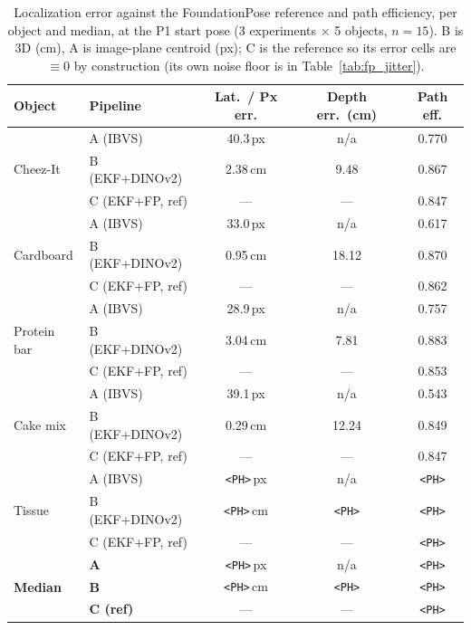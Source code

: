 \documentclass[letterpaper, 10 pt, conference]{ieeeconf}  %
\begin{document}
\begin{table}[t]
\centering
\caption{Localization error against the FoundationPose reference and path efficiency, per object and median, at the P1 start pose (3 experiments $\times$ 5 objects, $n = 15$). B is 3D (cm), A is image-plane centroid (px); C is the reference so its error cells are $\equiv 0$ by construction (its own noise floor is in Table~\ref{tab:fp_jitter}).}
\label{tab:exp1_main}
\footnotesize
\begin{tabular}{@{}llccc@{}}
\toprule
Object & Pipeline & Lat.\ / Px err. & Depth err.\ (cm) & Path eff. \\
\midrule
\multirow{3}{*}{Cheez-It}  & A (IBVS)        & 40.3\,px        & n/a        & 0.770 \\
                            & B (EKF+DINOv2)  & 2.38\,cm        & 9.48       & 0.867 \\
                            & C (EKF+FP, ref) & ---             & ---        & 0.847 \\
\midrule
\multirow{3}{*}{Cardboard} & A (IBVS)        & 33.0\,px        & n/a        & 0.617 \\
                            & B (EKF+DINOv2)  & 0.95\,cm        & 18.12      & 0.870 \\
                            & C (EKF+FP, ref) & ---             & ---        & 0.862 \\
\midrule
\multirow{3}{*}{Protein bar} & A (IBVS)      & 28.9\,px        & n/a        & 0.757 \\
                              & B (EKF+DINOv2)& 3.04\,cm        & 7.81       & 0.883 \\
                              & C (EKF+FP, ref) & ---           & ---        & 0.853 \\
\midrule
\multirow{3}{*}{Cake mix} & A (IBVS)         & 39.1\,px        & n/a        & 0.543 \\
                           & B (EKF+DINOv2)  & 0.29\,cm        & 12.24      & 0.849 \\
                           & C (EKF+FP, ref) & ---             & ---        & 0.847 \\
\midrule
\multirow{3}{*}{Tissue}    & A (IBVS)        & \texttt{<PH>}\,px   & n/a            & \texttt{<PH>} \\
                            & B (EKF+DINOv2) & \texttt{<PH>}\,cm   & \texttt{<PH>}  & \texttt{<PH>} \\
                            & C (EKF+FP, ref)& ---                 & ---            & \texttt{<PH>} \\
\midrule
\multirow{3}{*}{\textbf{Median}} & \textbf{A}            & \texttt{<PH>}\,px   & n/a           & \texttt{<PH>} \\
                                  & \textbf{B}           & \texttt{<PH>}\,cm   & \texttt{<PH>} & \texttt{<PH>} \\
                                  & \textbf{C (ref)}     & ---                 & ---           & \texttt{<PH>} \\
\bottomrule
\end{tabular}
\end{table}
\end{document}
